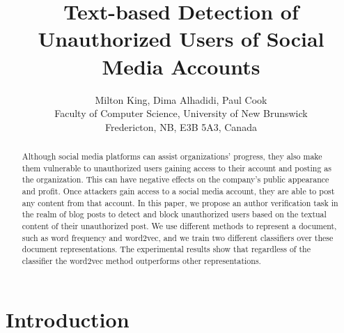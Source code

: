 \documentclass[11pt]{article}
\title{Text-based Detection of Unauthorized Users of Social Media Accounts}
\author{Milton King, Dima Alhadidi, Paul Cook  \\
Faculty of Computer Science, University of New Brunswick\\
Fredericton, NB, E3B 5A3, Canada\\
}
\begin{document}
\maketitle

\begin{abstract}
Although social media platforms can assist organizations' progress, they also make them vulnerable to unauthorized users gaining access to their account and posting as the organization. This can have negative effects on the company's  public appearance and profit. Once attackers gain access to a social media account, they are able to post any content from that account. In this paper, we propose an author verification task in the realm of blog posts to detect and block unauthorized users based on the textual content of their unauthorized post. We use different methods to represent a document, such as word frequency and word2vec, and we train two different classifiers over these document representations. The experimental results show that regardless of the classifier the word2vec method outperforms other representations.



\end{abstract}

\section{Introduction}
\end{document}
